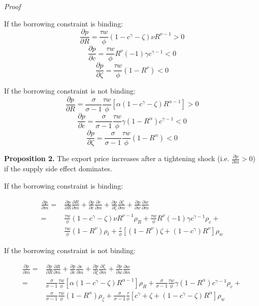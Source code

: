 \textit{Proof}

If the borrowing constraint is binding:
$$
\frac{\partial p}{\partial R}=\frac{\tau w}{\phi}(1-c^\gamma-\zeta)\nu R^{\nu-1}>0
$$
$$
\frac{\partial p}{\partial c}=\frac{\tau w}{\phi} R^\nu(-1)\gamma c^{\gamma-1}<0
$$
$$
\frac{\partial p}{\partial \zeta}=\frac{\tau w}{\phi}(1-R^\nu)<0
$$

If the borrowing constraint is not binding:
$$
\frac{\partial p}{\partial R}=\frac{\sigma}{\sigma-1}\frac{\tau w}{\phi}[\alpha(1-c^\gamma-\zeta)R^{\alpha-1}]>0
$$
$$
\frac{\partial p}{\partial c}=\frac{\sigma}{\sigma-1}\frac{\tau w}{\phi}\gamma(1-R^\alpha)c^{\gamma-1}<0
$$
$$
\frac{\partial p}{\partial \zeta}=\frac{\sigma}{\sigma-1}\frac{\tau w}{\phi} (1-R^\alpha)<0
$$


\textbf{Proposition 2.} The export price increases after a tightening shock (i.e. $\frac{\partial p}{\partial m}>0$) if the supply side effect dominates.

If the borrowing constraint is binding:

\begin{align*} 
\frac{\partial p}{\partial m} =&\frac{\partial p}{\partial R}\frac{\partial R}{\partial m}+\frac{\partial p}{\partial c}\frac{\partial c}{\partial m}+\frac{\partial p}{\partial \zeta}\frac{\partial \zeta}{\partial m}+\frac{\partial p}{\partial w}\frac{\partial w}{\partial m}  \\
=& \frac{\tau w}{\phi}(1-c^\gamma-\zeta)\nu R^{\nu-1} \rho_R+ \frac{\tau w}{\phi} R^\nu(-1)\gamma c^{\gamma-1} \rho_c +\\  
& \frac{\tau w}{\phi}(1-R^\nu) \rho_t+\frac{\tau}{\phi}[(1-R^\nu)\zeta+(1-c^\gamma)R^\nu] \rho_w
\end{align*} 

If the borrowing constraint is not binding:

\begin{align*} 
\frac{\partial p}{\partial m} =&\frac{\partial p}{\partial R}\frac{\partial R}{\partial m}+\frac{\partial p}{\partial c}\frac{\partial c}{\partial m}+\frac{\partial p}{\partial \zeta}\frac{\partial \zeta}{\partial m}+\frac{\partial p}{\partial w}\frac{\partial w}{\partial m}  \\
=& \frac{\sigma}{\sigma-1}\frac{\tau w}{\phi}[\alpha(1-c^\gamma-\zeta)R^{\alpha-1}] \rho_R + \frac{\sigma}{\sigma-1}\frac{\tau w}{\phi}\gamma(1-R^\alpha)c^{\gamma-1} \rho_c + \\
& \frac{\sigma}{\sigma-1}\frac{\tau w}{\phi} (1-R^\alpha) \rho_\zeta + \frac{\sigma}{\sigma-1}\frac{\tau}{\phi}[c^\gamma+\zeta+(1-c^\gamma-\zeta)R^\alpha] \rho_w
\end{align*} 

